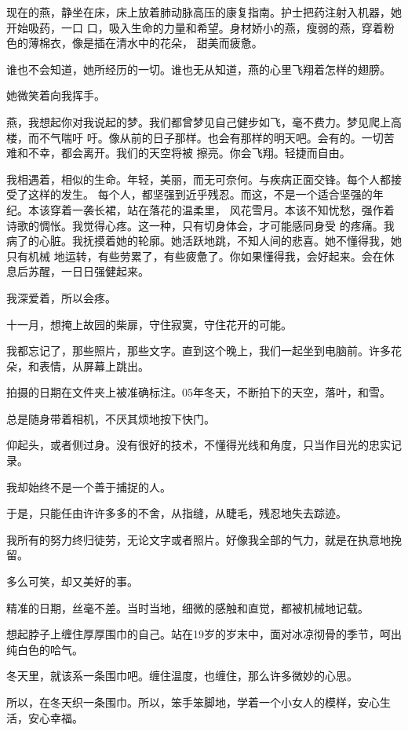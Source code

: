 		现在的燕，静坐在床，床上放着肺动脉高压的康复指南。护士把药注射入机器，她开始吸药，一口
	口，吸入生命的力量和希望。身材娇小的燕，瘦弱的燕，穿着粉色的薄棉衣，像是插在清水中的花朵，
	甜美而疲惫。

		谁也不会知道，她所经历的一切。谁也无从知道，燕的心里飞翔着怎样的翅膀。

		她微笑着向我挥手。

		燕，我想起你对我说起的梦。我们都曾梦见自己健步如飞，毫不费力。梦见爬上高楼，而不气喘吁
	吁。像从前的日子那样。也会有那样的明天吧。会有的。一切苦难和不幸，都会离开。我们的天空将被
	擦亮。你会飞翔。轻捷而自由。

		我相遇着，相似的生命。年轻，美丽，而无可奈何。与疾病正面交锋。每个人都接受了这样的发生。
	每个人，都坚强到近乎残忍。而这，不是一个适合坚强的年纪。本该穿着一袭长裙，站在落花的温柔里，
	风花雪月。本该不知忧愁，强作着诗歌的惆怅。我觉得心疼。这一种，只有切身体会，才可能感同身受
	的疼痛。我病了的心脏。我抚摸着她的轮廓。她活跃地跳，不知人间的悲喜。她不懂得我，她只有机械
	地运转，有些劳累了，有些疲惫了。你如果懂得我，会好起来。会在休息后苏醒，一日日强健起来。

		我深爱着，所以会疼。

	\endwriting



		十一月，想掩上故园的柴扉，守住寂寞，守住花开的可能。

		我都忘记了，那些照片，那些文字。直到这个晚上，我们一起坐到电脑前。许多花朵，和表情，从屏幕上跳出。

		拍摄的日期在文件夹上被准确标注。05年冬天，不断拍下的天空，落叶，和雪。\par
		总是随身带着相机，不厌其烦地按下快门。\par
		仰起头，或者侧过身。没有很好的技术，不懂得光线和角度，只当作目光的忠实记录。

		我却始终不是一个善于捕捉的人。

		于是，只能任由许许多多的不舍，从指缝，从睫毛，残忍地失去踪迹。

		我所有的努力终归徒劳，无论文字或者照片。好像我全部的气力，就是在执意地挽留。\par
		多么可笑，却又美好的事。

		精准的日期，丝毫不差。当时当地，细微的感触和直觉，都被机械地记载。

		想起脖子上缠住厚厚围巾的自己。站在19岁的岁末中，面对冰凉彻骨的季节，呵出纯白色的哈气。

		冬天里，就该系一条围巾吧。缠住温度，也缠住，那么许多微妙的心思。\par
		所以，在冬天织一条围巾。所以，笨手笨脚地，学着一个小女人的模样，安心生活，安心幸福。

